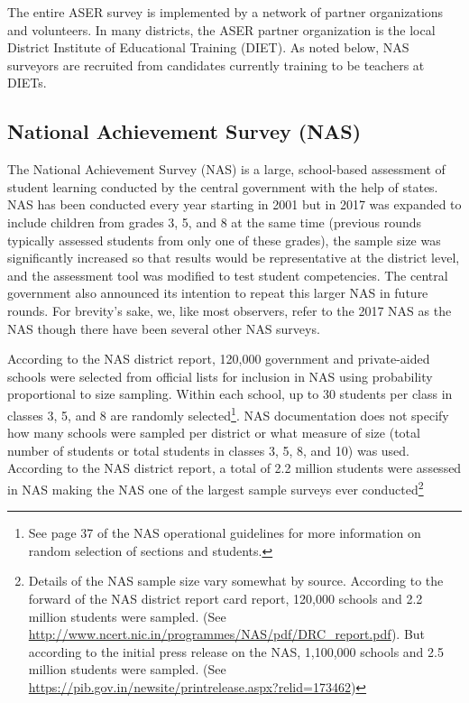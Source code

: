 \documentclass[
  11pt,
]{article}
\begin{document}
The entire ASER survey is implemented by a network of partner organizations and volunteers. In many districts, the ASER partner organization is the local District Institute of Educational Training (DIET). As noted below, NAS surveyors are recruited from candidates currently training to be teachers at DIETs.

\hypertarget{national-achievement-survey-nas}{%
\subsection{National Achievement Survey (NAS)}\label{national-achievement-survey-nas}}

The National Achievement Survey (NAS) is a large, school-based assessment of student learning conducted by the central government with the help of states. NAS has been conducted every year starting in 2001 but in 2017 was expanded to include children from grades 3, 5, and 8 at the same time (previous rounds typically assessed students from only one of these grades), the sample size was significantly increased so that results would be representative at the district level, and the assessment tool was modified to test student competencies. The central government also announced its intention to repeat this larger NAS in future rounds. For brevity's sake, we, like most observers, refer to the 2017 NAS as the NAS though there have been several other NAS surveys.

According to the NAS district report, 120,000 government and private-aided schools were selected from official lists for inclusion in NAS using probability proportional to size sampling. Within each school, up to 30 students per class in classes 3, 5, and 8 are randomly selected\footnote{See page 37 of the NAS operational guidelines for more information on random selection of sections and students.}. NAS documentation does not specify how many schools were sampled per district or what measure of size (total number of students or total students in classes 3, 5, 8, and 10) was used. According to the NAS district report, a total of 2.2 million students were assessed in NAS making the NAS one of the largest sample surveys ever conducted\footnote{Details of the NAS sample size vary somewhat by source. According to the forward of the NAS district report card report, 120,000 schools and 2.2 million students were sampled. (See \url{http://www.ncert.nic.in/programmes/NAS/pdf/DRC_report.pdf}). But according to the initial press release on the NAS, 1,100,000 schools and 2.5 million students were sampled. (See \url{https://pib.gov.in/newsite/printrelease.aspx?relid=173462})}
\end{document}
